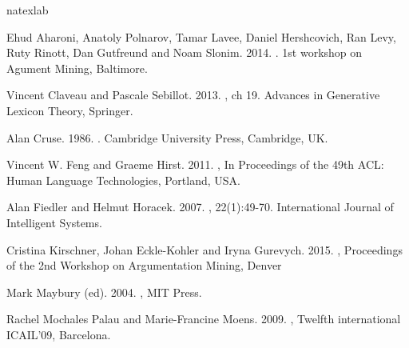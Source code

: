 \documentclass[11pt,letterpaper]{article}
\begin{document}
% 
\begin{thebibliography}{}
 \expandafter\ifx\csname natexlab\endcsname\relax\def\natexlab#1{#1}\fi

Ehud Aharoni, Anatoly Polnarov, Tamar Lavee, Daniel Hershcovich, Ran Levy, Ruty Rinott, Dan
Gutfreund and Noam Slonim. 2014.
 .
\newblock 1st workshop on Agument Mining, Baltimore.




\bibitem{}
 Vincent Claveau and Pascale Sebillot. 2013.
, ch 19.
\newblock Advances in Generative Lexicon Theory, Springer.

Alan Cruse. 1986.
.
\newblock Cambridge University Press, Cambridge, UK.

Vincent W. Feng and  Graeme Hirst. 2011.
, 
\newblock In Proceedings of the 49th ACL: Human Language Technologies, Portland,  USA.


Alan Fiedler and Helmut Horacek. 2007. 
,  22(1):49-70.
\newblock International Journal of Intelligent Systems.


Cristina  Kirschner, Johan  Eckle-Kohler and Iryna Gurevych. 2015. 
, 
\newblock  Proceedings of the 2nd Workshop on Argumentation Mining, Denver


Mark Maybury (ed). 2004.
, 
\newblock MIT Press.


Rachel Mochales Palau and Marie-Francine  Moens. 2009. 
,  
\newblock Twelfth international ICAIL'09, Barcelona.


\end{thebibliography}
\end{document}
